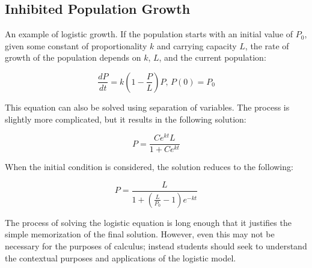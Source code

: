 \documentclass[11pt]{article}
\begin{document}
\subsection*{Inhibited Population Growth}
An example of logistic growth. If the population starts with an initial value of $P_0$, given some constant of proportionality $k$ and carrying capacity $L$, the rate of growth of the population depends on $k$, $L$, and the current population:

\[ \frac{dP}{dt} = k(1-\frac{P}{L})P\text{, }P(0)=P_0 \]

This equation can also be solved using separation of variables. The process is slightly more complicated, but it results in the following solution:

\[ P = \frac{Ce^{kt}L}{1+Ce^{kt}}\]

When the initial condition is considered, the solution reduces to the following:

\[ P = \frac{L}{1+(\frac{L}{P_0}-1)e^{-kt}}\]

The process of solving the logistic equation is long enough that it justifies the simple memorization of the final solution. However, even this may not be necessary for the purposes of calculus; instead students should seek to understand the contextual purposes and applications of the logistic model. 
\end{document}
